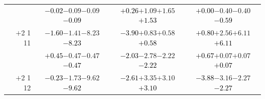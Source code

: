 \documentclass[compress]{beamer}
\begin{document}
\begin{frame}
\begin{tabular}{r | c | c | c}
          & \textcolor{black}{$-0.02$}\hspace{0.1 cm}$-0.09$\hspace{0.1 cm}$-0.09$\hspace{0.1 cm}\textcolor{black}{$-0.09$} & \textcolor{black}{$+0.26$}\hspace{0.1 cm}$+1.09$\hspace{0.1 cm}$+1.65$\hspace{0.1 cm}\textcolor{black}{$+1.53$} & \textcolor{black}{$+0.00$}\hspace{0.1 cm}$-0.40$\hspace{0.1 cm}$-0.40$\hspace{0.1 cm}\textcolor{black}{$-0.59$} \\
$+$2 1 11 & \textcolor{black}{$-1.60$}\hspace{0.1 cm}$-1.41$\hspace{0.1 cm}$-8.23$\hspace{0.1 cm}\textcolor{black}{$-8.23$} & \textcolor{black}{$-3.90$}\hspace{0.1 cm}$+0.83$\hspace{0.1 cm}$+0.58$\hspace{0.1 cm}\textcolor{black}{$+0.58$} & \textcolor{black}{$+0.80$}\hspace{0.1 cm}$+2.56$\hspace{0.1 cm}$+6.11$\hspace{0.1 cm}\textcolor{black}{$+6.11$} \\
          & \textcolor{black}{$+0.45$}\hspace{0.1 cm}$-0.47$\hspace{0.1 cm}$-0.47$\hspace{0.1 cm}\textcolor{black}{$-0.47$} & \textcolor{black}{$-2.03$}\hspace{0.1 cm}$-2.78$\hspace{0.1 cm}$-2.22$\hspace{0.1 cm}\textcolor{black}{$-2.22$} & \textcolor{black}{$+0.67$}\hspace{0.1 cm}$+0.07$\hspace{0.1 cm}$+0.07$\hspace{0.1 cm}\textcolor{black}{$+0.07$} \\
$+$2 1 12 & \textcolor{black}{$-0.23$}\hspace{0.1 cm}$-1.73$\hspace{0.1 cm}$-9.62$\hspace{0.1 cm}\textcolor{black}{$-9.62$} & \textcolor{black}{$-2.61$}\hspace{0.1 cm}$+3.35$\hspace{0.1 cm}$+3.10$\hspace{0.1 cm}\textcolor{black}{$+3.10$} & \textcolor{black}{$-3.88$}\hspace{0.1 cm}$-3.16$\hspace{0.1 cm}$-2.27$\hspace{0.1 cm}\textcolor{black}{$-2.27$} \\

\end{tabular}
\end{frame}
\end{document}
